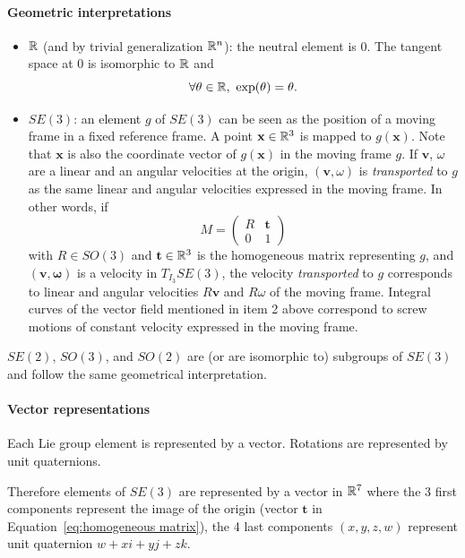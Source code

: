 \paragraph{Geometric interpretations}
\begin{itemize}
\item $\mathbb{R}$ (and by trivial generalization $\mathbb{R}^n$): the neutral element is $0$. The tangent space at 0 is isomorphic to $\mathbb{R}$ and
  $$
  \forall \theta\in\mathbb{R},\  \exp(\theta) = \theta.
  $$
\item $SE(3)$: an element $g$ of $SE(3)$ can be seen as the position of a moving frame in a fixed reference frame. A point $\mathbf{x}\in\mathbb{R}^3$ is mapped to $g(\mathbf{x})$. Note that $\mathbf{x}$ is also the coordinate vector of $g(\mathbf{x})$ in the moving frame $g$. If $\mathbf{v}$, $\omega$ are a linear and an angular velocities at the origin, $(\mathbf{v},\omega)$ is \textit{transported} to $g$
  as the same linear and angular velocities expressed in the moving frame. In other words, if
  \begin{equation}\label{eq:homogeneous matrix}
  M=\left(\begin{array}{ll} R & \mathbf{t}\\ 0 & 1\end{array}\right)
    \end{equation}
  with $R\in SO(3)$ and $\mathbf{t}\in\mathbb{R}^3$  is the homogeneous matrix
  representing $g$, and $(\mathbf{v},\mathbf{\omega})$ is a velocity in $T_{I_3}SE(3)$, the velocity \textit{transported} to $g$ corresponds to linear and angular velocities $R\mathbf{v}$ and $R\omega$ of the moving frame.
  Integral curves of the vector field mentioned in item 2 above correspond to screw motions of constant velocity expressed in the moving frame.
\end{itemize}
$SE(2)$, $SO(3)$, and $SO(2)$ are (or are isomorphic to) subgroups of $SE(3)$ and follow the same geometrical interpretation.

\paragraph{Vector representations}
Each Lie group element is represented by a vector. Rotations are represented by
unit quaternions.

Therefore elements of $SE(3)$ are represented by a vector in $\mathbb{R}^7$ where the 3 first components represent the image of the origin (vector $\mathbf{t}$ in Equation~\ref{eq:homogeneous matrix}), the 4 last components $(x,y,z,w)$ represent unit quaternion $w + x {i} + y {j} + z {k}$.

